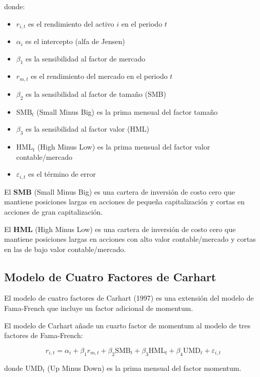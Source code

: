 donde:
\begin{itemize}
\item $r_{i,t}$ es el rendimiento del activo $i$ en el periodo $t$
\item $\alpha_i$ es el intercepto (alfa de Jensen)
\item $\beta_1$ es la sensibilidad al factor de mercado
\item $r_{m,t}$ es el rendimiento del mercado en el periodo $t$
\item $\beta_2$ es la sensibilidad al factor de tamaño (SMB)
\item $\text{SMB}_t$ (Small Minus Big) es la prima mensual del factor tamaño
\item $\beta_3$ es la sensibilidad al factor valor (HML)
\item $\text{HML}_t$ (High Minus Low) es la prima mensual del factor valor contable/mercado
\item $\varepsilon_{i,t}$ es el término de error
\end{itemize}

\begin{definicion}
El \textbf{SMB} (Small Minus Big) es una cartera de inversión de costo cero que mantiene posiciones largas en acciones de pequeña capitalización y cortas en acciones de gran capitalización.
\end{definicion}

\begin{definicion}
El \textbf{HML} (High Minus Low) es una cartera de inversión de costo cero que mantiene posiciones largas en acciones con alto valor contable/mercado y cortas en las de bajo valor contable/mercado.
\end{definicion}

\subsection{Modelo de Cuatro Factores de Carhart}

El modelo de cuatro factores de Carhart (1997) es una extensión del modelo de Fama-French que incluye un factor adicional de momentum.

\begin{teorema}
El modelo de Carhart añade un cuarto factor de momentum al modelo de tres factores de Fama-French:

\begin{equation}
r_{i,t} = \alpha_i + \beta_1 r_{m,t} + \beta_2 \text{SMB}_t + \beta_3 \text{HML}_t + \beta_4 \text{UMD}_t + \varepsilon_{i,t}
\end{equation}

donde $\text{UMD}_t$ (Up Minus Down) es la prima mensual del factor momentum.
\end{teorema}

